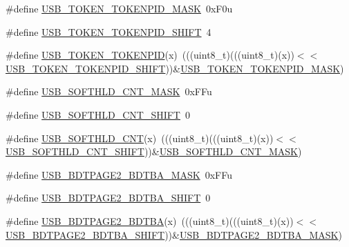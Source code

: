 \begin{DoxyCompactItemize}
\item 
\#define \hyperlink{group___u_s_b___register___masks_ga8880174ec35cfb684d2bcc6e0d5a52bc}{U\+S\+B\+\_\+\+T\+O\+K\+E\+N\+\_\+\+T\+O\+K\+E\+N\+P\+I\+D\+\_\+\+M\+A\+SK}~0x\+F0u
\item 
\#define \hyperlink{group___u_s_b___register___masks_gae410fcf426d2212be6468703734f6ed9}{U\+S\+B\+\_\+\+T\+O\+K\+E\+N\+\_\+\+T\+O\+K\+E\+N\+P\+I\+D\+\_\+\+S\+H\+I\+FT}~4
\item 
\#define \hyperlink{group___u_s_b___register___masks_ga74fd206a0132343b30c41a2184f18ea0}{U\+S\+B\+\_\+\+T\+O\+K\+E\+N\+\_\+\+T\+O\+K\+E\+N\+P\+ID}(x)~(((uint8\+\_\+t)(((uint8\+\_\+t)(x))$<$$<$\hyperlink{group___u_s_b___register___masks_gae410fcf426d2212be6468703734f6ed9}{U\+S\+B\+\_\+\+T\+O\+K\+E\+N\+\_\+\+T\+O\+K\+E\+N\+P\+I\+D\+\_\+\+S\+H\+I\+FT}))\&\hyperlink{group___u_s_b___register___masks_ga8880174ec35cfb684d2bcc6e0d5a52bc}{U\+S\+B\+\_\+\+T\+O\+K\+E\+N\+\_\+\+T\+O\+K\+E\+N\+P\+I\+D\+\_\+\+M\+A\+SK})
\item 
\#define \hyperlink{group___u_s_b___register___masks_gab71f8a7be8b025453facbce8d45b7bcc}{U\+S\+B\+\_\+\+S\+O\+F\+T\+H\+L\+D\+\_\+\+C\+N\+T\+\_\+\+M\+A\+SK}~0x\+F\+Fu
\item 
\#define \hyperlink{group___u_s_b___register___masks_gaf4b663b6276ba642abfdedf79fac92c6}{U\+S\+B\+\_\+\+S\+O\+F\+T\+H\+L\+D\+\_\+\+C\+N\+T\+\_\+\+S\+H\+I\+FT}~0
\item 
\#define \hyperlink{group___u_s_b___register___masks_ga6a373b5dfe5c4aa910fd120cc169a4b9}{U\+S\+B\+\_\+\+S\+O\+F\+T\+H\+L\+D\+\_\+\+C\+NT}(x)~(((uint8\+\_\+t)(((uint8\+\_\+t)(x))$<$$<$\hyperlink{group___u_s_b___register___masks_gaf4b663b6276ba642abfdedf79fac92c6}{U\+S\+B\+\_\+\+S\+O\+F\+T\+H\+L\+D\+\_\+\+C\+N\+T\+\_\+\+S\+H\+I\+FT}))\&\hyperlink{group___u_s_b___register___masks_gab71f8a7be8b025453facbce8d45b7bcc}{U\+S\+B\+\_\+\+S\+O\+F\+T\+H\+L\+D\+\_\+\+C\+N\+T\+\_\+\+M\+A\+SK})
\item 
\#define \hyperlink{group___u_s_b___register___masks_ga69407c90a73a26bc60f3f9b75e4bd7c0}{U\+S\+B\+\_\+\+B\+D\+T\+P\+A\+G\+E2\+\_\+\+B\+D\+T\+B\+A\+\_\+\+M\+A\+SK}~0x\+F\+Fu
\item 
\#define \hyperlink{group___u_s_b___register___masks_gae67d0252b1559f854264f0fe52ff6fb5}{U\+S\+B\+\_\+\+B\+D\+T\+P\+A\+G\+E2\+\_\+\+B\+D\+T\+B\+A\+\_\+\+S\+H\+I\+FT}~0
\item 
\#define \hyperlink{group___u_s_b___register___masks_ga1b7b12b3e6686e4b15b1cfa072a805eb}{U\+S\+B\+\_\+\+B\+D\+T\+P\+A\+G\+E2\+\_\+\+B\+D\+T\+BA}(x)~(((uint8\+\_\+t)(((uint8\+\_\+t)(x))$<$$<$\hyperlink{group___u_s_b___register___masks_gae67d0252b1559f854264f0fe52ff6fb5}{U\+S\+B\+\_\+\+B\+D\+T\+P\+A\+G\+E2\+\_\+\+B\+D\+T\+B\+A\+\_\+\+S\+H\+I\+FT}))\&\hyperlink{group___u_s_b___register___masks_ga69407c90a73a26bc60f3f9b75e4bd7c0}{U\+S\+B\+\_\+\+B\+D\+T\+P\+A\+G\+E2\+\_\+\+B\+D\+T\+B\+A\+\_\+\+M\+A\+SK})
$$
\end{DoxyCompactItemize}
